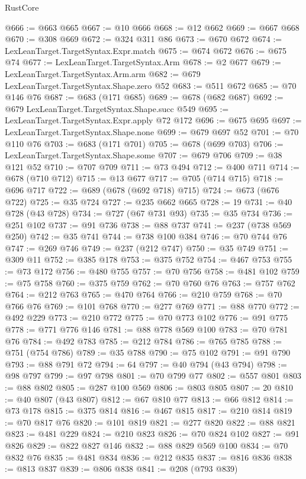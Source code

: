 \begin{lexlean}{RustCore}
\begin{coremodule}
@666 := @663 @665
@667 := @10 @666
@668 := @12 @662
@669 := @667 @668
@670 := @308 @669
@672 := @324 @311 @86
@673 := @670 @672
@674 := LexLeanTarget.TargetSyntax.Expr.match
@675 := @674 @672
@676 := @675 @74
@677 := LexLeanTarget.TargetSyntax.Arm
@678 := @2 @677
@679 := LexLeanTarget.TargetSyntax.Arm.arm
@682 := @679 LexLeanTarget.TargetSyntax.Shape.zero @52
@683 := @511 @672
@685 := @70 @146 @76
@687 := @683 (@171 @685)
@689 := @678 (@682 @687)
@692 := @679 LexLeanTarget.TargetSyntax.Shape.succ @549
@695 := LexLeanTarget.TargetSyntax.Expr.apply @72 @172
@696 := @675 @695
@697 := LexLeanTarget.TargetSyntax.Shape.none
@699 := @679 @697 @52
@701 := @70 @110 @76
@703 := @683 (@171 @701)
@705 := @678 (@699 @703)
@706 := LexLeanTarget.TargetSyntax.Shape.some
@707 := @679 @706
@709 := @38 @121 @52
@710 := @707 @709
@711 := @73 @494
@712 := @400 @711
@714 := @678 (@710 @712)
@715 := @13 @677
@717 := @705 (@714 @715)
@718 := @696 @717
@722 := @689 (@678 (@692 @718) @715)
@724 := @673 (@676 @722)
@725 := @35 @724
@727 := @235 @662 @665
@728 := 19
@731 := @40 @728 (@43 @728)
@734 := @727 (@67 @731 @93)
@735 := @35 @734
@736 := @251 @102
@737 := @91 @736
@738 := @88 @737
@741 := @237 (@738 @569 @250)
@742 := @35 @741
@744 := @738 @100 @384
@746 := @70 @744 @76
@747 := @269 @746
@749 := @237 (@212 @747)
@750 := @35 @749
@751 := @309 @11
@752 := @385 @178
@753 := @375 @752
@754 := @467 @753
@755 := @73 @172
@756 := @480 @755
@757 := @70 @756
@758 := @481 @102
@759 := @75 @758
@760 := @375 @759
@762 := @70 @760 @76
@763 := @757 @762
@764 := @212 @763
@765 := @470 @764
@766 := @210 @759
@768 := @70 @766 @76
@769 := @101 @768
@770 := @277 @769
@771 := @88 @770
@772 := @492 @229
@773 := @210 @772
@775 := @70 @773 @102
@776 := @91 @775
@778 := @771 @776 @146
@781 := @88 @778 @569 @100
@783 := @70 @781 @76
@784 := @492 @783
@785 := @212 @784
@786 := @765 @785
@788 := @751 (@754 @786)
@789 := @35 @788
@790 := @75 @102
@791 := @91 @790
@793 := @88 @791 @72
@794 := 64
@797 := @40 @794 (@43 @794)
@798 := @98 @797
@799 := @97 @798
@801 := @70 @799 @77
@802 := @557 @801
@803 := @88 @802
@805 := @287 @100 @569
@806 := @803 @805
@807 := 20
@810 := @40 @807 (@43 @807)
@812 := @67 @810 @77
@813 := @66 @812
@814 := @73 @178
@815 := @375 @814
@816 := @467 @815
@817 := @210 @814
@819 := @70 @817 @76
@820 := @101 @819
@821 := @277 @820
@822 := @88 @821
@823 := @481 @229
@824 := @210 @823
@826 := @70 @824 @102
@827 := @91 @826
@829 := @822 @827 @146
@832 := @88 @829 @569 @100
@834 := @70 @832 @76
@835 := @481 @834
@836 := @212 @835
@837 := @816 @836
@838 := @813 @837
@839 := @806 @838
@841 := @208 (@793 @839)

\end{coremodule}
\end{lexlean}

